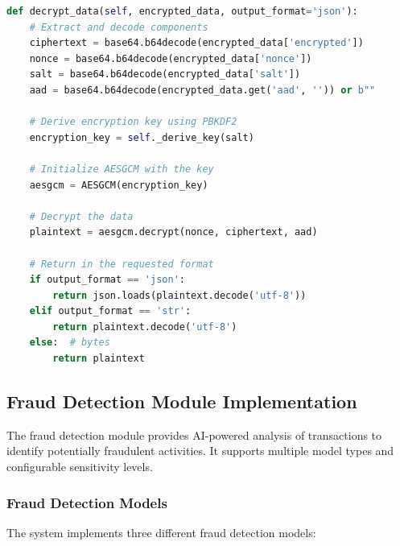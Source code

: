 \documentclass[onecolumn,a4paper,10pt]{IEEEtran}
\begin{document}
\begin{lstlisting}[language=Python, caption=Data Decryption Using Quantum Key]
def decrypt_data(self, encrypted_data, output_format='json'):
    # Extract and decode components
    ciphertext = base64.b64decode(encrypted_data['encrypted'])
    nonce = base64.b64decode(encrypted_data['nonce'])
    salt = base64.b64decode(encrypted_data['salt'])
    aad = base64.b64decode(encrypted_data.get('aad', '')) or b""
    
    # Derive encryption key using PBKDF2
    encryption_key = self._derive_key(salt)
    
    # Initialize AESGCM with the key
    aesgcm = AESGCM(encryption_key)
    
    # Decrypt the data
    plaintext = aesgcm.decrypt(nonce, ciphertext, aad)
    
    # Return in the requested format
    if output_format == 'json':
        return json.loads(plaintext.decode('utf-8'))
    elif output_format == 'str':
        return plaintext.decode('utf-8')
    else:  # bytes
        return plaintext
\end{lstlisting}

\subsection{Fraud Detection Module Implementation}
The fraud detection module provides AI-powered analysis of transactions to identify potentially fraudulent activities. It supports multiple model types and configurable sensitivity levels.

\subsubsection{Fraud Detection Models}
The system implements three different fraud detection models:
\end{document}

